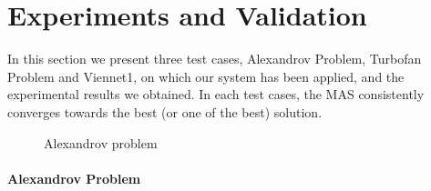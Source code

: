 \part{Experiments and Validation}

In this section we present three test cases, Alexandrov Problem, Turbofan Problem and Viennet1, on which our system has been applied, and the experimental results we obtained. In each test cases, the MAS consistently converges towards the best (or one of the best) solution.

\begin{figure}
\centering
	\hfill%
	\subfloat[corresponding agent graph.]{\begin{minipage}{0.5\textwidth}%
		\centering
		\texttt{[image: testcases-Alexandrov]}%
		\label{alexandrov:graph}
	\end{minipage}}
	\caption{Alexandrov problem}
	\label{alexandrov}
	\vspace{-20pt}
\end{figure}

\subsection{Alexandrov Problem}

